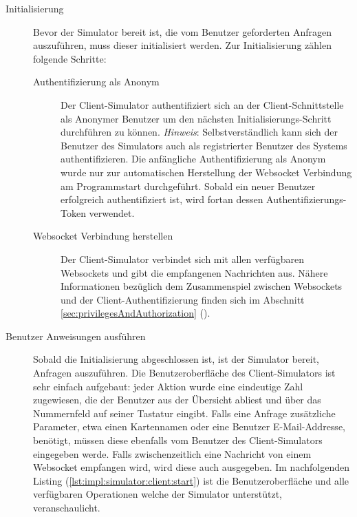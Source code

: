 \begin{description}
\item[Initialisierung] Bevor der Simulator bereit ist, die vom Benutzer geforderten Anfragen auszuführen, muss dieser initialisiert werden. Zur Initialisierung zählen folgende Schritte: 
\begin{description}
    \item[Authentifizierung als Anonym] Der Client-Simulator authentifiziert sich an der Client-Schnittstelle als Anonymer Benutzer um den nächsten Initialisierungs-Schritt durchführen zu können. \textit{Hinweis}: Selbstverständlich kann sich der Benutzer des Simulators auch als registrierter Benutzer des Systems authentifizieren. Die anfängliche Authentifizierung als Anonym wurde nur zur automatischen Herstellung der Websocket Verbindung am Programmstart durchgeführt. Sobald ein neuer Benutzer erfolgreich authentifiziert ist, wird fortan dessen Authentifizierungs-Token verwendet.
    \item[Websocket Verbindung herstellen] Der Client-Simulator verbindet sich mit allen verfügbaren Websockets und gibt die empfangenen Nachrichten aus. Nähere Informationen bezüglich dem Zusammenspiel zwischen Websockets und der Client-Authentifizierung finden sich im Abschnitt \ref{sec:privilegesAndAuthorization} ().  
\end{description}
\item[Benutzer Anweisungen ausführen] Sobald die Initialisierung abgeschlossen ist, ist der Simulator bereit, Anfragen auszuführen. Die Benutzeroberfläche des Client-Simulators ist sehr einfach aufgebaut: jeder Aktion wurde eine eindeutige Zahl zugewiesen, die der Benutzer aus der Übersicht abliest und über das Nummernfeld auf seiner Tastatur eingibt. Falls eine Anfrage zusätzliche Parameter, etwa einen Kartennamen oder eine Benutzer E-Mail-Addresse, benötigt, müssen diese ebenfalls vom Benutzer des Client-Simulators eingegeben werde. Falls zwischenzeitlich eine Nachricht von einem Websocket empfangen wird, wird diese auch ausgegeben. %
\noindent Im nachfolgenden Listing (\ref{lst:impl:simulator:client:start}) ist die Benutzeroberfläche und alle verfügbaren Operationen welche der Simulator unterstützt, veranschaulicht. 
\end{description}
